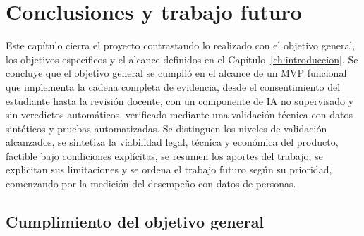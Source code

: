 \chapter{Conclusiones y trabajo futuro}
\label{ch:conclusiones}

\begin{chapterabstract}
Este capítulo cierra el proyecto contrastando lo realizado con el objetivo general, los objetivos específicos y el alcance definidos en el Capítulo~\ref{ch:introduccion}. Se concluye que el objetivo general se cumplió en el alcance de un MVP funcional que implementa la cadena completa de evidencia, desde el consentimiento del estudiante hasta la revisión docente, con un componente de IA no supervisado y sin veredictos automáticos, verificado mediante una validación técnica con datos sintéticos y pruebas automatizadas. Se distinguen los niveles de validación alcanzados, se sintetiza la viabilidad legal, técnica y económica del producto, factible bajo condiciones explícitas, se resumen los aportes del trabajo, se explicitan sus limitaciones y se ordena el trabajo futuro según su prioridad, comenzando por la medición del desempeño con datos de personas.
\end{chapterabstract}

\section{Cumplimiento del objetivo general}
\label{sec:concl_objetivo_general}

